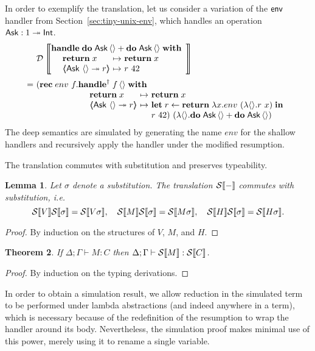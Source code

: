 \documentclass[12pt,phd,lfcs,twoside,openright,logo,leftchapter,normalheadings]{infthesis}
\theoremstyle{plain}
\newtheorem{theorem}{Theorem}[chapter]
\newtheorem{lemma}[theorem]{Lemma}
\theoremstyle{definition}
\begin{document}
In order to exemplify the translation, let us consider a variation of
the $\mathsf{env}$ handler from Section~\ref{sec:tiny-unix-env}, which
handles an operation $\mathsf{Ask} : 1 \twoheadrightarrow \mathsf{Int}$.
%
\[
  \ba{@{~}l@{~}l}
  &\mathcal{D}\left\llbracket
    \ba[m]{@{}l}
      \Handle\;\Do\;\Ask\,\Unit + \Do\;\Ask\,\Unit\;\With\\
        \quad\ba[m]{@{~}l@{~}c@{~}l}
           \Return\;x &\mapsto& \Return\;x\\
           \OpCase{\Ask}{\Unit}{r} &\mapsto& r~42
         \ea
    \ea
  \right\rrbracket \medskip\\
  =& \bl
    (\Rec\;env~f.
      \bl
         \ShallowHandle\;f\,\Unit\;\With\\
         \quad\ba[t]{@{~}l@{~}c@{~}l}
           \Return\;x &\mapsto& \Return\;x\\
           \OpCase{\Ask}{\Unit}{r} &\mapsto&
             \bl
             \Let\;r \revto \Return\;\lambda x.env~(\lambda\Unit.r~x)\;\In\\
             r~42)~(\lambda\Unit.\Do\;\Ask\,\Unit + \Do\;\Ask\,\Unit)
             \el
         \ea
         \el
     \el
  \ea
\]
%
The deep semantics are simulated by generating the name $env$ for the
shallow handlers and recursively apply the handler under the modified
resumption.

The translation commutes with substitution and preserves typeability.
%
\begin{lemma}\label{lem:dstrans-subst}
  Let $\sigma$ denote a substitution. The translation $\mathcal{S}\llbracket - \rrbracket$
  commutes with substitution, i.e.
  \[
    \mathcal{S}\llbracket V \rrbracket\mathcal{S}\llbracket \sigma \rrbracket = \mathcal{S}\llbracket V\sigma \rrbracket,\quad
    \mathcal{S}\llbracket M \rrbracket\mathcal{S}\llbracket \sigma \rrbracket = \mathcal{S}\llbracket M\sigma \rrbracket,\quad
    \mathcal{S}\llbracket H \rrbracket\mathcal{S}\llbracket \sigma \rrbracket = \mathcal{S}\llbracket H\sigma \rrbracket.
  \]
\end{lemma}
%
\begin{proof}
  By induction on the structures of $V$, $M$, and $H$.
\end{proof}

\begin{theorem}
If $\Delta; \Gamma \vdash M : C$ then $\Delta; \Gamma \vdash
\mathcal{S}\llbracket M \rrbracket : \mathcal{S}\llbracket C \rrbracket$.
\end{theorem}
%
\begin{proof}
  By induction on the typing derivations.
\end{proof}

In order to obtain a simulation result, we allow reduction in the
simulated term to be performed under lambda abstractions (and indeed
anywhere in a term), which is necessary because of the redefinition of
the resumption to wrap the handler around its body.
%
Nevertheless, the simulation proof makes minimal use of this power,
merely using it to rename a single variable.
%
\end{document}
